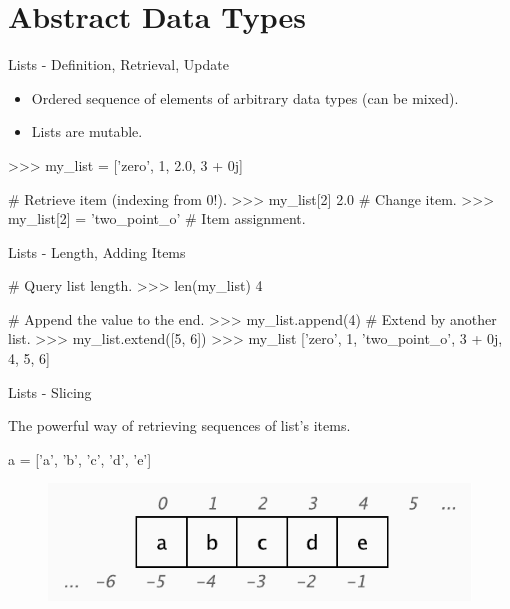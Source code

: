 \documentclass[10pt]{beamer}
\begin{document}

\section{Abstract Data Types}

\begin{frame}[fragile]{Lists - Definition, Retrieval, Update}
\begin{itemize}
\item  Ordered sequence of elements of arbitrary data types (can be mixed).
\item  Lists are mutable.
\end{itemize}


\begin{pythoncode}
>>> my_list = ['zero', 1, 2.0, 3 + 0j]
\end{pythoncode}

\begin{pythoncode}
# Retrieve item (indexing from 0!).
>>> my_list[2]
2.0
# Change item.
>>> my_list[2] = 'two_point_o'  # Item assignment.
\end{pythoncode}
\end{frame}

\begin{frame}[fragile]{Lists - Length, Adding Items}
\begin{pythoncode}
# Query list length.
>>> len(my_list)
4
\end{pythoncode}


\begin{pythoncode}
# Append the value to the end.
>>> my_list.append(4)
# Extend by another list.
>>> my_list.extend([5, 6])
>>> my_list
['zero', 1, 'two_point_o', 3 + 0j, 4, 5, 6]
\end{pythoncode}
\end{frame}

\begin{frame}[fragile]{Lists - Slicing}

The powerful way of retrieving sequences of list's items.


\begin{pythoncode}
a = ['a', 'b', 'c', 'd', 'e']
\end{pythoncode}


\begin{figure}[!h]
\centering
\includegraphics[width=0.6\linewidth]{img/slicing.pdf}
\end{figure}
\end{frame}
\end{document}
